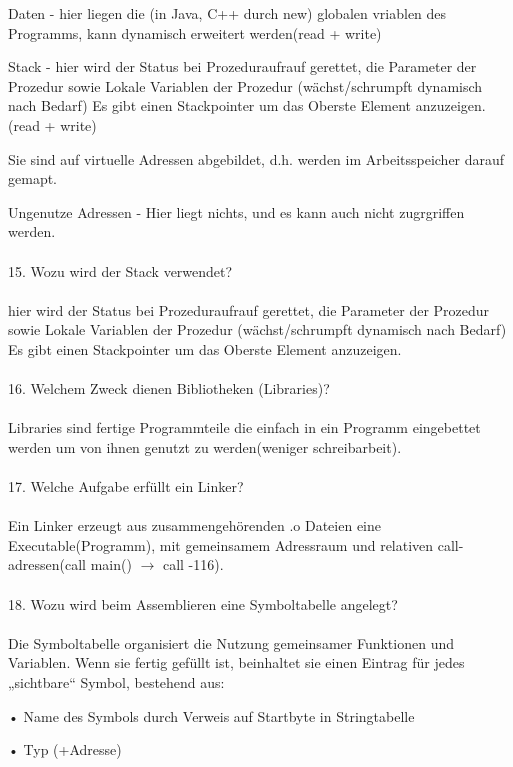 \documentclass{article}
\newcommand\tab[1][1cm]{\hspace*{#1}}
\begin{document}
Daten - hier liegen die (in Java, C++ durch  new) globalen vriablen des Programms, kann dynamisch erweitert werden(read + write)

Stack - hier wird der Status bei Prozeduraufrauf gerettet, die Parameter der Prozedur sowie Lokale Variablen der Prozedur (wächst/schrumpft dynamisch nach Bedarf) Es gibt einen Stackpointer um das Oberste Element anzuzeigen.(read + write)

Sie sind auf virtuelle Adressen abgebildet, d.h. werden im Arbeitsspeicher darauf gemapt.


Ungenutze Adressen - Hier liegt nichts, und es kann auch nicht zugrgriffen werden.
\\
\\
15. Wozu wird der Stack verwendet?
\\
\\
 hier wird der Status bei Prozeduraufrauf gerettet, die Parameter der Prozedur sowie Lokale Variablen der Prozedur (wächst/schrumpft dynamisch nach Bedarf) Es gibt einen Stackpointer um das Oberste Element anzuzeigen.
\\
\\
16. Welchem Zweck dienen Bibliotheken (Libraries)?
\\
\\
Libraries sind fertige Programmteile die einfach in ein Programm eingebettet werden um von ihnen genutzt zu werden(weniger schreibarbeit).
\\
\\
17. Welche Aufgabe erfüllt ein Linker?
\\
\\
Ein Linker erzeugt aus zusammengeh\"orenden .o Dateien eine Executable(Programm), mit gemeinsamem Adressraum und relativen call-adressen(call main() $\rightarrow$ call -116).
\\
\\
18. Wozu wird beim Assemblieren eine Symboltabelle angelegt?
\\
\\
Die Symboltabelle organisiert die Nutzung gemeinsamer Funktionen und Variablen. Wenn sie fertig gef\"ullt ist, beinhaltet sie einen Eintrag für jedes „sichtbare“ Symbol, bestehend aus:

\tab • Name des Symbols durch Verweis auf Startbyte in Stringtabelle

\tab • Typ (+Adresse)
\end{document}
